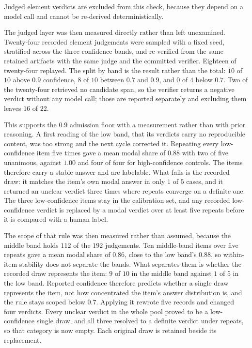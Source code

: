 \documentclass[11pt,a4paper]{article}
\begin{document}
Judged element verdicts are excluded from this check, because they depend on a model
call and cannot be re-derived deterministically.

The judged layer was then measured directly rather than left unexamined. Twenty-four
recorded element judgements were sampled with a fixed seed, stratified across the three
confidence bands, and re-verified from the same retained artifacts with the same judge
and the committed verifier. Eighteen of twenty-four replayed. The split by band is the
result rather than the total: $10$ of $10$ above $0.9$ confidence, $8$ of $10$ between
$0.7$ and $0.9$, and $0$ of $4$ below $0.7$. Two of the twenty-four retrieved no
candidate span, so the verifier returns a negative verdict without any model call; those
are reported separately and excluding them leaves $16$ of $22$.

This supports the $0.9$ admission floor with a measurement rather than with prior
reasoning. A first reading of the low band, that its verdicts carry no reproducible
content, was too strong and the next cycle corrected it. Repeating every low-confidence
item five times gave a mean modal share of $0.88$ with two of five unanimous, against
$1.00$ and four of four for high-confidence controls. The items therefore carry a stable
answer and are labelable. What fails is the recorded draw: it matches the item's own
modal answer in only $1$ of $5$ cases, and it returned an unclear verdict three times
where repeats converge on a definite one. The three low-confidence items stay in the
calibration set, and any recorded low-confidence verdict is replaced by a modal verdict
over at least five repeats before it is compared with a human label.

The scope of that rule was then measured rather than assumed, because the middle band
holds $112$ of the $192$ judgements. Ten middle-band items over five repeats gave a mean
modal share of $0.86$, close to the low band's $0.88$, so within-item stability does not
separate the bands. What separates them is whether the recorded draw represents the
item: $9$ of $10$ in the middle band against $1$ of $5$ in the low band. Reported
confidence therefore predicts whether a single draw represents the item, not how
concentrated the item's answer distribution is, and the rule stays scoped below $0.7$.
Applying it rewrote five records and changed four verdicts. Every unclear verdict in the
whole pool proved to be a low-confidence single draw, and all three resolved to a
definite verdict under repeats, so that category is now empty. Each original draw is
retained beside its replacement.
\end{document}
